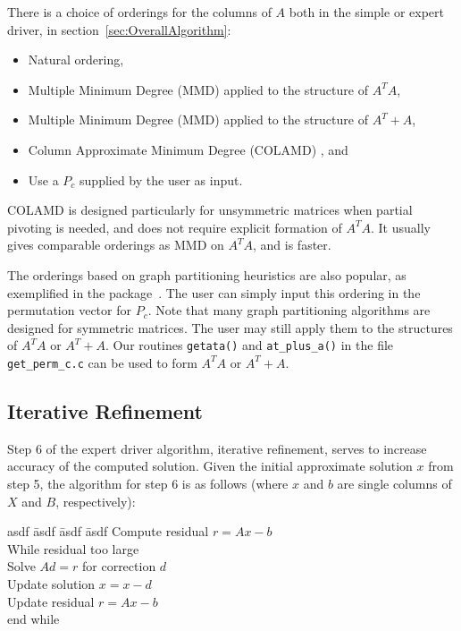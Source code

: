 There is a choice of orderings for the columns of $A$ both in the
simple or expert driver, in section~\ref{sec:OverallAlgorithm}:
\begin{itemize}
\item Natural ordering,%
\item Multiple Minimum Degree (MMD) \cite{liu85} applied to the structure of $A^TA$,
\item Multiple Minimum Degree (MMD) \cite{liu85} applied to the structure of $A^T+A$,
\item Column Approximate Minimum Degree (COLAMD) \cite{davisgilbert04}, and
\item Use a $P_c$ supplied by the user as input.
\end{itemize}

COLAMD is designed particularly for unsymmetric matrices when partial
pivoting is needed, and does not require explicit formation of $A^TA$.
It usually gives comparable orderings
as MMD on $A^TA$, and is faster. %

The orderings based on graph partitioning heuristics are also
popular, as exemplified in the {\metis} package~\cite{kaku:98a}.
The user can simply input this ordering in the permutation vector
for $P_c$. Note that many graph partitioning algorithms are designed
for symmetric matrices. The user may still apply them to the structures
of $A^TA$ or $A^T+A$. Our routines {\tt getata()}
and {\tt at\_plus\_a()} in the file {\tt get\_perm\_c.c} can be used
to form $A^TA$ or $A^T+A$.

\subsection{Iterative Refinement}

Step 6 of the expert driver algorithm, 
iterative refinement, serves to increase accuracy of the computed solution.
Given the initial approximate solution $x$ from step 5, the algorithm for
step 6 is as follows (where $x$ and $b$ are single columns of $X$ and $B$, 
respectively):

\begin{tabbing}
asdf \= asdf \= asdf \= asdf \kill
\> Compute residual $r = Ax-b$ \\
\> While residual too large \\
\> \> Solve $Ad=r$ for correction $d$ \\
\> \> Update solution $x = x-d$ \\
\> \> Update residual $r = Ax-b$ \\
\> end while 
\end{tabbing}

